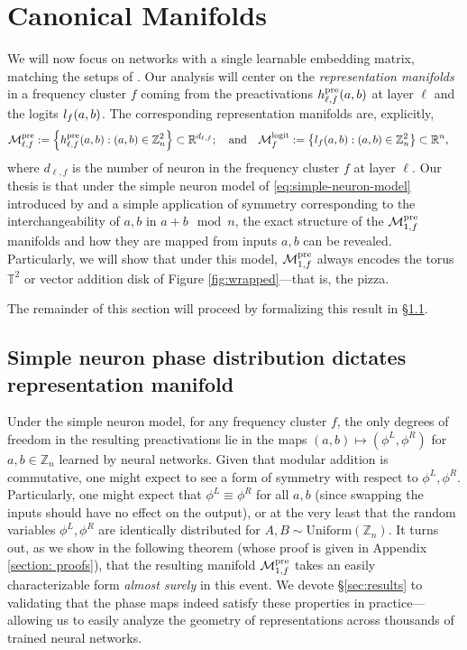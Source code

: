 \section{Canonical Manifolds}
We will now focus on networks with a single learnable embedding matrix, matching the setups of \citet{nanda2023progress,zhong2023the,mccracken2025uncoveringuniversalabstractalgorithm}.
Our analysis will center on the \emph{representation manifolds} in a frequency cluster $f$ coming from the preactivations $h_{\ell, f}^{\mathrm{pre}}(a, b)$ at layer $\ell$ and the logits $l_{f}(a, b)$. The corresponding representation manifolds are, explicitly,
\begin{align*}
    \mathcal{M}^{\rm pre}_{\ell, f} &:= \left\{h_{\ell, f}^{\mathrm{pre}}(a, b) : (a, b)\in\mathbb{Z}_n^2\right\} \subset \mathbb{R}^{d_{\ell,f}};\quad\mathrm{and}\quad
    \mathcal{M}^{\rm logit}_{f} := \left\{l_{f}(a, b) : (a, b)\in\mathbb{Z}_n^2\right\}\subset\mathbb{R}^n,
\end{align*}
where $d_{\ell, f}$ is the number of neuron in the frequency cluster $f$ at layer $\ell$.
Our thesis is that under the simple neuron model of \eqref{eq:simple-neuron-model} introduced by \citet{mccracken2025uncoveringuniversalabstractalgorithm} and a simple application of symmetry corresponding to the interchangeability of $a, b$ in $a + b \mod n$, the exact structure of the $\mathcal{M}^{\rm pre}_{1, f}$ manifolds and how they are mapped from inputs $a, b$ can be revealed.
Particularly, we will show that under this model, $\mathcal{M}^{\rm pre}_{1, f}$ always encodes the torus $\mathbb{T}^2$ or vector addition disk of Figure \ref{fig:wrapped}---that is, the pizza.

The remainder of this section will proceed by formalizing this result in \S\ref{subsect:theorems}.


\subsection{Simple neuron phase distribution dictates representation manifold}\label{subsect:theorems}
Under the simple neuron model, for any frequency cluster $f$, the only degrees of freedom in the resulting preactivations lie in the maps $(a, b)\mapsto(\phi^L, \phi^R)$ for $a,b\in\mathbb{Z}_n$ learned by neural networks.
Given that modular addition is commutative, one might expect to see a form of symmetry with respect to $\phi^L, \phi^R$.
Particularly, one might expect that $\phi^L\equiv\phi^R$ for all $a, b$ (since swapping the inputs should have no effect on the output), or at the very least that the random variables $\phi^L, \phi^R$ are identically distributed for $A, B\sim\mathrm{Uniform}(\mathbb{Z}_n)$.
It turns out, as we show in the following theorem (whose proof is given in Appendix \ref{section: proofs}), that the resulting manifold $\mathcal{M}^{\rm pre}_{1, f}$ takes an easily characterizable form \textit{almost surely} in this event.
We devote \S\ref{sec:results} to validating that the phase maps indeed satisfy these properties in practice---allowing us to easily analyze the geometry of representations across thousands of trained neural networks.

